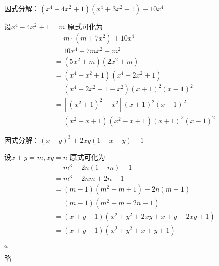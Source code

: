 \documentclass[windows,csize4,answers]{BHCexam}
\begin{document}
\begin{groups}
\begin{questions}[]
        \question[5] 因式分解：$(x^4-4x^2+1)(x^4+3x^2+1)+10x^4$
        \begin{solution}{0.5cm}
            \methodonly 设$x^4-4x^2+1=m$ 原式可化为
            \[
                \begin{aligned}
                     & \phantom{=}m\cdot (m+7x^2)+10x^4   \\
                     & = 10x^4 + 7mx^2 + m^2              \\
                     & = (5x^2+m)(2x^2+m)                 \\
                     & = (x^4 + x^2+1)(x^4-2x^2+1)        \\
                     & = (x^4+2x^2+1-x^2)(x+1)^2(x-1)^2   \\
                     & = [(x^2+1)^2 -x^2](x+1)^2(x-1)^2   \\
                     & = (x^2+x+1)(x^2-x+1)(x+1)^2(x-1)^2
                \end{aligned}
            \]
        \end{solution}
        \vspace{3.5cm}


        \question[5] 因式分解：$(x+y)^3+2xy(1-x-y)-1$
        \begin{solution}{0.5cm}
            \methodonly 设$x+y=m,xy=n$ 原式可化为
            \[
                \begin{aligned}
                     & \phantom{=}m^3+2n(1-m)-1         \\
                     & = m^3-2nm+2n-1                   \\
                     & = (m-1)(m^2+m+1) -2n(m-1)        \\
                     & = (m-1)(m^2+m-2n+1)              \\
                     & = (x+y-1)(x^2+y^2+2xy+x+y-2xy+1) \\
                     & = (x+y-1)(x^2+y^2+x+y+1)
                \end{aligned}
            \]
        \end{solution}
        \vspace{3.5cm}

        \question[5] $a$
        \begin{solution}{0.5cm}
            \methodonly $略$
        \end{solution}
        \vspace{3.5cm}


    \end{questions}

\end{groups}


\label{lastpage}
\end{document}

